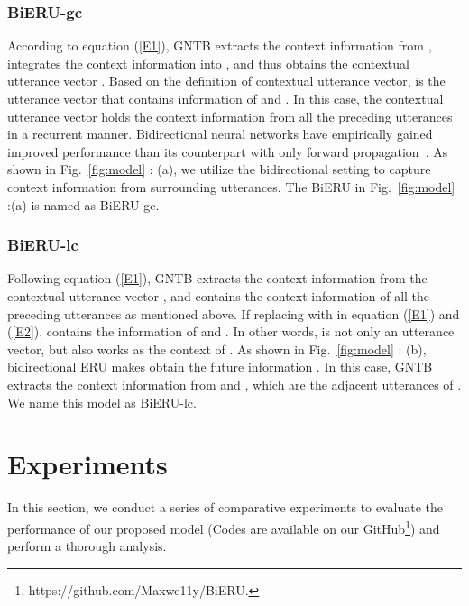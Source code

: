 \documentclass[journal]{IEEEtran}
\begin{document}
\subsubsection{BiERU-gc}
According to equation (\ref{E1}), GNTB extracts the context information from , integrates the context information into , and thus obtains the contextual utterance vector . Based on the definition of contextual utterance vector,  is the utterance vector that contains information of  and . In this case, the contextual utterance vector  holds the context information from all the preceding utterances  in a recurrent manner. 
{Bidirectional neural networks have empirically gained improved performance than its counterpart with only forward propagation~\cite{schuster1997bidirectional}. As shown in Fig.~\ref{fig:model} : (a), we utilize the bidirectional setting to capture context information from surrounding utterances.}
The BiERU in Fig.~\ref{fig:model} :(a) is named as BiERU-gc.
\subsubsection{BiERU-lc}
Following equation (\ref{E1}), GNTB extracts the context information from the contextual utterance vector , and  contains the context information of all the preceding utterances  as mentioned above. If replacing  with  in equation (\ref{E1}) and (\ref{E2}),  contains the information of  and . In other words,  is not only an utterance vector, but also works as the context of . As shown in Fig.~\ref{fig:model} : (b), bidirectional ERU makes  obtain the future information . In this case, GNTB extracts the context information from  and , which are the adjacent utterances of . We name this model as BiERU-lc.

\section{Experiments}
\label{sec:experiments}
In this section, we conduct a series of comparative experiments to evaluate the performance of our proposed model (Codes are available on our GitHub\footnote{https://github.com/Maxwe11y/BiERU.}) and perform a thorough analysis.
\end{document}
